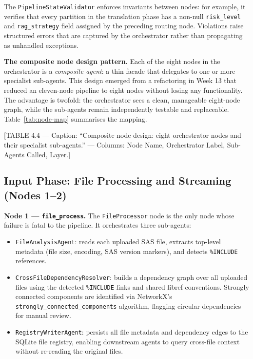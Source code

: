 The \texttt{PipelineStateValidator} enforces invariants between nodes: for
example, it verifies that every partition in the translation phase has a
non-null \texttt{risk\_level} and \texttt{rag\_strategy} field assigned by the
preceding routing node. Violations raise structured errors that are captured by
the orchestrator rather than propagating as unhandled exceptions.

\textbf{The composite node design pattern.} Each of the eight nodes in the
orchestrator is a \emph{composite agent}: a thin facade that delegates to one
or more specialist sub-agents. This design emerged from a refactoring in Week 13
that reduced an eleven-node pipeline to eight nodes without losing any
functionality. The advantage is twofold: the orchestrator sees a clean,
manageable eight-node graph, while the sub-agents remain independently testable
and replaceable. Table~\ref{tab:node-map} summarises the mapping.

[TABLE 4.4 --- Caption: ``Composite node design: eight orchestrator nodes and
their specialist sub-agents.'' --- Columns: Node Name, Orchestrator Label,
Sub-Agents Called, Layer.]

\subsection{Input Phase: File Processing and Streaming (Nodes 1--2)}
\label{subsec:nodes-input}

\textbf{Node 1 --- \texttt{file\_process}.} The \texttt{FileProcessor} node
is the only node whose failure is fatal to the pipeline. It orchestrates three
sub-agents:

\begin{itemize}
  \item \texttt{FileAnalysisAgent}: reads each uploaded SAS file, extracts
    top-level metadata (file size, encoding, SAS version markers), and detects
    \texttt{\%INCLUDE} references.
  \item \texttt{CrossFileDependencyResolver}: builds a dependency graph over
    all uploaded files using the detected \texttt{\%INCLUDE} links and shared
    libref conventions. Strongly connected components are identified via
    NetworkX's \texttt{strongly\_connected\_components} algorithm, flagging
    circular dependencies for manual review.
  \item \texttt{RegistryWriterAgent}: persists all file metadata and dependency
    edges to the SQLite file registry, enabling downstream agents to query
    cross-file context without re-reading the original files.
\end{itemize}

